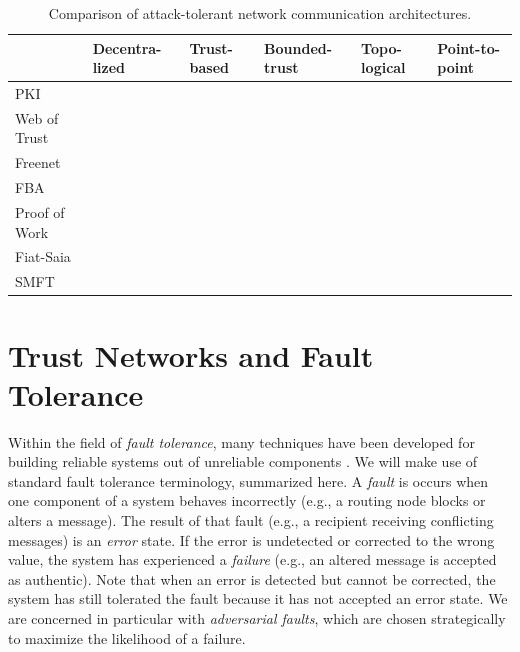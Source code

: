 \documentclass[10pt,letterpaper]{article}
\newcommand{\cmark}{\ding{51}}
\begin{document}
\begin{table}[t!]
\caption{Comparison of attack-tolerant network communication architectures.\label{tab:compare}}
\begin{center}
\begin{tabular}{l|p{0.6in}p{0.6in}p{0.6in}p{0.6in}p{0.6in}}
                              & Decentra-lized & Trust-based & Bounded-trust & Topo-logical & Point-to-point \\
\hline
PKI            &               & \cmark      & \cmark        &             & \cmark     \\
Web of Trust   & \cmark        & \cmark      &               &             & \cmark     \\
Freenet        & \cmark        & \cmark      & \cmark        &             &            \\
FBA            & \cmark        & \cmark      & \cmark        &             & \cmark     \\
Proof of Work  & \cmark        &             & \cmark        &             &            \\
Fiat-Saia      & \cmark        & \cmark      & \cmark        & \cmark      &            \\
SMFT           & \cmark        & \cmark      & \cmark        & \cmark      & \cmark     \\
\hline
\end{tabular}
\end{center}
\end{table}

\section*{Trust Networks and Fault Tolerance}
\label{sec-ft}

Within the field of {\em fault tolerance},
many techniques have been developed for building reliable systems
out of unreliable components
\cite{avizienis_basic_2004, von_neumann_probabilistic_1956}.
We will make use of standard fault tolerance terminology, summarized here.
A {\em fault} is occurs when one component
of a system behaves incorrectly (e.g., a routing node blocks or
alters a message).
The result of that fault (e.g., a recipient receiving conflicting messages)
is an {\em error} state.
If the error is undetected or corrected to the wrong value,
the system has experienced a {\em failure} (e.g., an altered message is
accepted as authentic).
Note that when an error is detected but cannot be corrected,
the system has still tolerated the fault because it has not accepted an error
state.
We are concerned in particular with {\em adversarial faults},
which are chosen strategically to maximize the likelihood of a failure.
\end{document}
